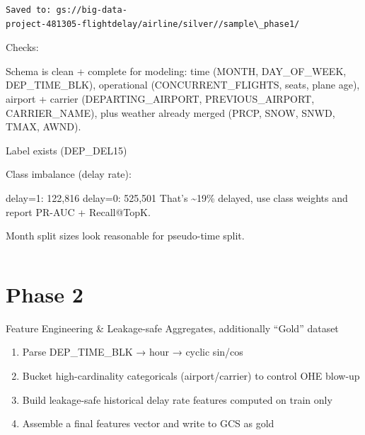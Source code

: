 \documentclass[11pt]{article}
\makeatletter
\providecommand{\tightlist}{%
      \setlength{\itemsep}{0pt}\setlength{\parskip}{0pt}}
\newcommand{\boxspacing}{\kern\kvtcb@left@rule\kern\kvtcb@boxsep}
\newcommand{\prompt}[4]{
        {\ttfamily\llap{{\color{#2}[#3]:\hspace{3pt}#4}}\vspace{-\baselineskip}}
    }
\makeatother
\begin{document}
    \begin{Verbatim}[commandchars=\\\{\}]

    \end{Verbatim}

    \begin{Verbatim}[commandchars=\\\{\}]
Saved to: gs://big-data-
project-481305-flightdelay/airline/silver//sample\_phase1/
    \end{Verbatim}

    Checks:

Schema is clean + complete for modeling: time (MONTH, DAY\_OF\_WEEK,
DEP\_TIME\_BLK), operational (CONCURRENT\_FLIGHTS, seats, plane age),
airport + carrier (DEPARTING\_AIRPORT, PREVIOUS\_AIRPORT,
CARRIER\_NAME), plus weather already merged (PRCP, SNOW, SNWD, TMAX,
AWND).

Label exists (DEP\_DEL15)

Class imbalance (delay rate):

delay=1: 122,816 delay=0: 525,501 That's \textasciitilde19\% delayed,
use class weights and report PR-AUC + Recall@TopK.

Month split sizes look reasonable for pseudo-time split.

    \begin{tcolorbox}[breakable, size=fbox, boxrule=1pt, pad at break*=1mm,colback=cellbackground, colframe=cellborder]
\prompt{In}{incolor}{ }{\boxspacing}
\begin{Verbatim}[commandchars=\\\{\}]

\end{Verbatim}
\end{tcolorbox}

    \section{Phase 2}\label{phase-2}

    Feature Engineering \& Leakage-safe Aggregates, additionally ``Gold''
dataset

    \begin{enumerate}
\def\labelenumi{\arabic{enumi}.}
\tightlist
\item
  Parse DEP\_TIME\_BLK → hour → cyclic sin/cos
\item
  Bucket high-cardinality categoricals (airport/carrier) to control OHE
  blow-up
\item
  Build leakage-safe historical delay rate features computed on train
  only
\item
  Assemble a final features vector and write to GCS as gold
\end{enumerate}
\end{document}
